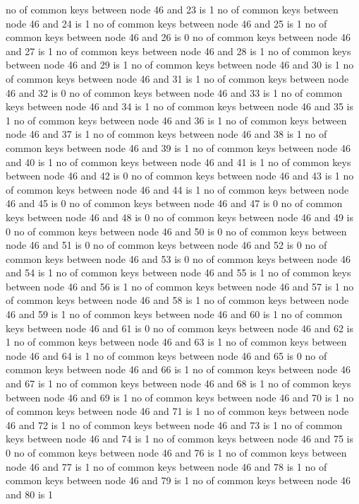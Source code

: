 no of common keys between node 46 and 23 is 1
no of common keys between node 46 and 24 is 1
no of common keys between node 46 and 25 is 1
no of common keys between node 46 and 26 is 0
no of common keys between node 46 and 27 is 1
no of common keys between node 46 and 28 is 1
no of common keys between node 46 and 29 is 1
no of common keys between node 46 and 30 is 1
no of common keys between node 46 and 31 is 1
no of common keys between node 46 and 32 is 0
no of common keys between node 46 and 33 is 1
no of common keys between node 46 and 34 is 1
no of common keys between node 46 and 35 is 1
no of common keys between node 46 and 36 is 1
no of common keys between node 46 and 37 is 1
no of common keys between node 46 and 38 is 1
no of common keys between node 46 and 39 is 1
no of common keys between node 46 and 40 is 1
no of common keys between node 46 and 41 is 1
no of common keys between node 46 and 42 is 0
no of common keys between node 46 and 43 is 1
no of common keys between node 46 and 44 is 1
no of common keys between node 46 and 45 is 0
no of common keys between node 46 and 47 is 0
no of common keys between node 46 and 48 is 0
no of common keys between node 46 and 49 is 0
no of common keys between node 46 and 50 is 0
no of common keys between node 46 and 51 is 0
no of common keys between node 46 and 52 is 0
no of common keys between node 46 and 53 is 0
no of common keys between node 46 and 54 is 1
no of common keys between node 46 and 55 is 1
no of common keys between node 46 and 56 is 1
no of common keys between node 46 and 57 is 1
no of common keys between node 46 and 58 is 1
no of common keys between node 46 and 59 is 1
no of common keys between node 46 and 60 is 1
no of common keys between node 46 and 61 is 0
no of common keys between node 46 and 62 is 1
no of common keys between node 46 and 63 is 1
no of common keys between node 46 and 64 is 1
no of common keys between node 46 and 65 is 0
no of common keys between node 46 and 66 is 1
no of common keys between node 46 and 67 is 1
no of common keys between node 46 and 68 is 1
no of common keys between node 46 and 69 is 1
no of common keys between node 46 and 70 is 1
no of common keys between node 46 and 71 is 1
no of common keys between node 46 and 72 is 1
no of common keys between node 46 and 73 is 1
no of common keys between node 46 and 74 is 1
no of common keys between node 46 and 75 is 0
no of common keys between node 46 and 76 is 1
no of common keys between node 46 and 77 is 1
no of common keys between node 46 and 78 is 1
no of common keys between node 46 and 79 is 1
no of common keys between node 46 and 80 is 1
